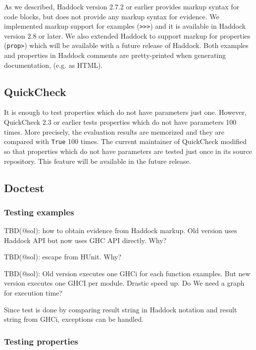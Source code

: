 \documentclass[preprint]{sigplanconf}
\begin{document}
As we described, Haddock version 2.7.2 or earlier provides markup syntax for
code blocks, but does not provide any markup syntax for evidence.
We implemented markup support for examples ({\tt >>>}) and it is available in
Haddock version 2.8 or later.
We also extended Haddock to support markup for properties ({\tt prop>}) which
will be available with a future release of Haddock.
Both examples and properties in Haddock comments are pretty-printed when
generating documentation, (e.g. as HTML).

\subsection{QuickCheck}

It is enough to test properties which do not have parameters just one.
However, QuickCheck 2.3 or earlier tests
properties which do not have parameters 100 times.
More precisely, the evaluation results are memorized and they are
compared with {\tt True} 100 times.
The current maintainer of QuickCheck modified so that
properties which do not have parameters
are tested just once in its source repository.
This feature will be available in the future release.

\subsection{Doctest}
\label{sec:doctest}

\subsubsection{Testing examples}

TBD(@sol): how to obtain evidence from Haddock markup.
Old version uses Haddock API but now uses GHC API directly. Why?

TBD(@sol): escape from HUnit. Why?

TBD(@sol): Old version executes one GHCi for each function examples.
But new version executes one GHCI per module.
Drastic speed up. Do We need a graph for execution time?

Since test is done by comparing result string in Haddock notation
and result string from GHCi, exceptions can be handled.

\subsubsection{Testing properties}
\end{document}
